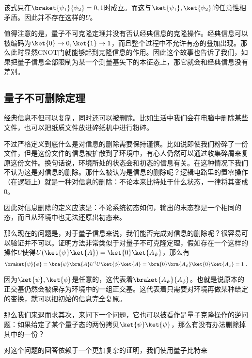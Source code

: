 该式只在$\braket{\psi_1}{\psi_2}=0,1$时成立。而这与$\ket{\psi_1},\ket{\psi_2}$的任意性相矛盾。因此并不存在这样的$U$。

值得注意的是，量子不可克隆定理并没有否认经典信息的克隆操作。经典信息可以被编码为$\ket{0}\to0,\ket{1}\to1$，而且整个过程中不允许有态的叠加出现。那么此时显然CNOT门就能够起到克隆信息的作用。因此这个故事也告诉了我们，如果把量子信息全部限制为某一个测量基矢下的本征态上，那它就会和经典信息没有差别。

\subsection{量子不可删除定理}

经典信息不但可以复制，同时还可以被删除。比如生活中我们会在电脑中删除某些文件，也可以把纸质文件放进碎纸机中进行粉碎。

不过严格定义到底什么是对信息的删除需要保持谨慎。比如说即使我们粉碎了一份文件，但是这份文件的信息被扩散到了环境中，有心人仍然可以通过收集碎屑来复原这份文件。换句话说，环境所处的状态会和初态的信息有关。在这种情况下我们不认为这是对信息的删除。那什么被认为是信息的删除呢？逻辑电路里的置零操作（在逻辑上）就是一种对信息的删除：不论本来比特处于什么状态，一律将其变成0。

因此对信息删除的定义应该是：不论系统初态如何，输出的末态都是一个相同的态，而且从环境中也无法还原出初态来。

那么现在的问题是，对于量子信息来说，我们能否完成对信息的删除呢？很容易可以验证并不可以。证明方法非常类似于对量子不可克隆定理，假如存在一个这样的操作$U$使得$U(\ket{\psi}\ket{A})=\ket{0}\ket{A_\psi}$，那么有
\begin{equation}
\braket{\psi}{\phi}=\bra{\psi}\bra{A}U^\dagger U\ket{\phi}\ket{A}=\bra{0}\bra{A_\psi}\ket{0}\ket{A_\phi}=1~.
\end{equation}

因为$\ket{\psi},\ket{\phi}$是任意的，这代表着$\braket{A_\psi}{A_\phi}$。也就是说原本的正交基仍然会被保存为环境中的一组正交基。这代表着只需要对环境再做某种给定的变换，就可以把初始的信息完全复原。

那么我们来退而求其次，来问下一个问题，它也可以被看作是量子克隆操作的逆问题：如果给定了某个量子态的两份拷贝$\ket{\psi}\ket{\psi}$，那么有没有办法删除掉其中的一份？

对这个问题的回答依赖于一个更加复杂的证明，我们使用量子比特来